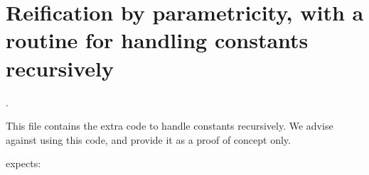 \begin{coqdoccode}
\end{coqdoccode}
\section{Reification by parametricity, with a routine for handling constants recursively}

\begin{coqdoccode}
\coqdocnoindent
{}  .\coqdoceol
\coqdocemptyline
\end{coqdoccode}
This file contains the extra code to handle constants recursively.
    We advise against using this code, and provide it as a proof of
    concept only. 

 expects:

